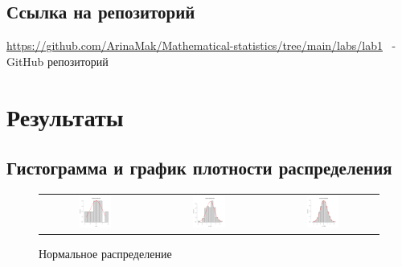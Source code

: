 \documentclass[a4paper,14pt]{article}
\begin{document}
		\subsection{Ссылка на репозиторий}
		\url{https://github.com/ArinaMak/Mathematical-statistics/tree/main/labs/lab1} \ - GitHub репозиторий
	
	\section{Результаты}
	\subsection{Гистограмма и график плотности распределения}
	\begin{figure}[H]
		\centering
		\begin{tabular}{c c c}
			\includegraphics[height = 0.25\textheight, width = 0.31\textwidth]{./lab1_1/pictures/ n = 10 normal distribution.png}
			& \includegraphics[height = 0.25\textheight, width = 0.31\textwidth]{./lab1_1/pictures/ n = 100 normal distribution.png}
			& \includegraphics[height = 0.25\textheight, width = 0.31\textwidth]{./lab1_1/pictures/ n = 1000 normal distribution.png}
		\end{tabular}
		\caption{Нормальное распределение}
	\end{figure}
	
\end{document}
